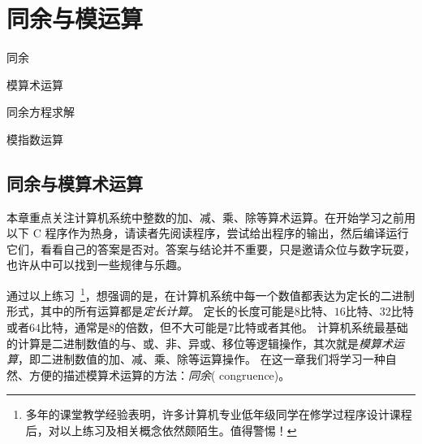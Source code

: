 \chapter{同余与模运算}
\label{chap:cong} 

\begin{introduction}
  \item 同余
  \item 模算术运算
  \item 同余方程求解
  \item 模指数运算
\end{introduction}

\section{同余与模算术运算}
\label{sec:congruence}

本章重点关注计算机系统中整数的加、减、乘、除等算术运算。在开始学习之前用以下 C 程序作为热身，请读者先阅读程序，尝试给出程序的输出，然后编译运行它们，看看自己的答案是否对。答案与结论并不重要，只是邀请众位与数字玩耍，也许从中可以找到一些规律与乐趣。

\begin{center}
	
\end{center}

\begin{center}
	
\end{center}

通过以上练习~\footnote{多年的课堂教学经验表明，许多计算机专业低年级同学在修学过程序设计课程后，对以上练习及相关概念依然颇陌生。值得警惕！}，想强调的是，在计算机系统中每一个数值都表达为定长的二进制形式，其中的所有运算都是\emph{定长计算}。
定长的长度可能是$8$比特、$16$比特、$32$比特或者$64$比特，通常是$8$的倍数，但不大可能是$7$比特或者其他。
计算机系统最基础的计算是二进制数值的与、或、非、异或、移位等逻辑操作，其次就是\emph{模算术运算}，即二进制数值的加、减、乘、除等运算操作。 
在这一章我们将学习一种自然、方便的描述模算术运算的方法：\emph{同余}( congruence)。

